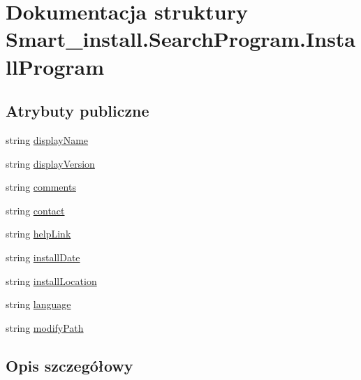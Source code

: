 \hypertarget{struct_smart__install_1_1_search_program_1_1_install_program}{\section{Dokumentacja struktury Smart\+\_\+install.\+Search\+Program.\+Install\+Program}
\label{struct_smart__install_1_1_search_program_1_1_install_program}
}
\subsection*{Atrybuty publiczne}
\begin{DoxyCompactItemize}
\item 
string \hyperlink{struct_smart__install_1_1_search_program_1_1_install_program_a07c41cefb50c426c1df814338c30a478}{display\+Name}
\item 
string \hyperlink{struct_smart__install_1_1_search_program_1_1_install_program_ae0e1bf0c9bae9086be9174f97da9884f}{display\+Version}
\item 
string \hyperlink{struct_smart__install_1_1_search_program_1_1_install_program_a4328e53b176bc95dbeeda397045f893b}{comments}
\item 
string \hyperlink{struct_smart__install_1_1_search_program_1_1_install_program_a9ac05784dcc59e1f79fe162c873d48d7}{contact}
\item 
string \hyperlink{struct_smart__install_1_1_search_program_1_1_install_program_a343596c9b762754aa6875d7241a2f331}{help\+Link}
\item 
string \hyperlink{struct_smart__install_1_1_search_program_1_1_install_program_a3088b7eee1a31636eb1f874087f13644}{install\+Date}
\item 
string \hyperlink{struct_smart__install_1_1_search_program_1_1_install_program_aaf8fac1b00267733b9b77b05eeea0cf8}{install\+Location}
\item 
string \hyperlink{struct_smart__install_1_1_search_program_1_1_install_program_a8934b1419bdba4c690faec433c722d81}{language}
\item 
string \hyperlink{struct_smart__install_1_1_search_program_1_1_install_program_ac037e0544c982fbda344ce0fb8af4062}{modify\+Path}
\end{DoxyCompactItemize}


\subsection{Opis szczegółowy}


